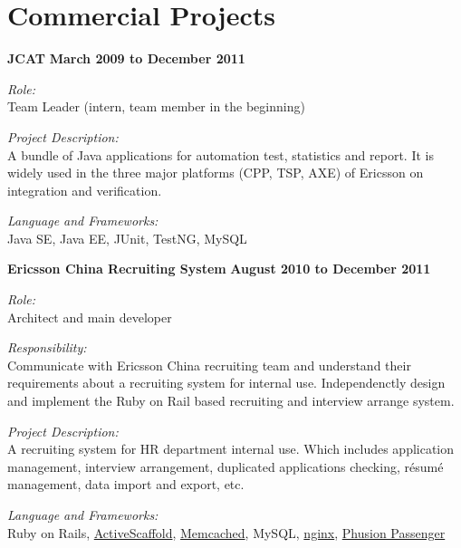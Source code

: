 
\section{Commercial Projects}
\textbf{JCAT}
\hfill \textbf{March 2009 to December 2011}
\begin{outerlist}
\item \textit{Role:}\\
Team Leader (intern, team member in the beginning)
\item \textit{Project Description:}\\
A bundle of Java applications for automation test, statistics and report. It is widely used in the three major platforms (CPP, TSP, AXE) of Ericsson on integration and verification.
\item \textit{Language and Frameworks:}\\
Java SE, Java EE, JUnit, TestNG, MySQL
\end{outerlist}
\blankline

\textbf{Ericsson China Recruiting System}
\hfill \textbf{August 2010 to December 2011}
\begin{outerlist}
\item \textit{Role:}\\
Architect and main developer
\item \textit{Responsibility:}\\
Communicate with Ericsson China recruiting team and understand their requirements about a recruiting system for internal use. Independenctly design and implement the Ruby on Rail based recruiting and interview arrange system.
\item \textit{Project Description:}\\
A recruiting system for HR department internal use. Which includes application management, interview arrangement, duplicated applications checking, r\'{e}sum\'{e} management, data import and export, etc. 
\item \textit{Language and Frameworks:}\\
Ruby on Rails, 
\href{http://activescaffold.com/}{ActiveScaffold},
\href{http://memcached.org/}{Memcached}, MySQL, 
\href{http://nginx.net/}{nginx}, 
\href{http://www.modrails.com/}{Phusion Passenger\texttrademark}
\end{outerlist}
\blankline

